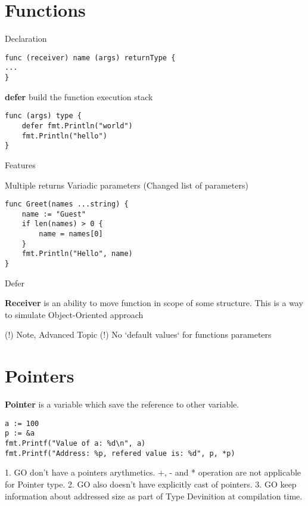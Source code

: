 \documentclass[12pt]{article}
\begin{document}
\newpage
\section{Functions}

Declaration
\begin{lstlisting}
func (receiver) name (args) returnType {
...
}
\end{lstlisting}

\textbf{defer} build the function execution stack
\begin{lstlisting}
func (args) type {
    defer fmt.Println("world")
    fmt.Println("hello")
}
\end{lstlisting}

Features

Multiple returns
Variadic parameters (Changed list of parameters)
\begin{lstlisting}
func Greet(names ...string) {
    name := "Guest"
    if len(names) > 0 {
        name = names[0]
    }
    fmt.Println("Hello", name)
}
\end{lstlisting}
Defer

\textbf{Receiver} is an ability to move function in scope of some structure. This is
a way to simulate Object-Oriented approach

(!) Note, Advanced Topic (!)
No `default values` for functions parameters


\newpage
\section{Pointers}
\textbf{Pointer} is a variable which save the reference to other variable.

\begin{paracol}{2} \begin{leftcolumn}
\begin{lstlisting}
a := 100
p := &a
fmt.Printf("Value of a: %d\n", a)
fmt.Printf("Address: %p, refered value is: %d", p, *p)
\end{lstlisting}
\end{leftcolumn} \begin{rightcolumn}
1. GO don't have a pointers arythmetics. +, - and * operation are not applicable
for Pointer type.
2. GO also doesn't have explicitly cast of pointers.
3. GO keep information about addressed size as part of Type Devinition at
compilation time.

\end{rightcolumn}
\end{paracol}
\end{document}
